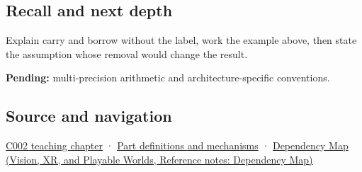 \subsection{Recall and next depth}\label{appendix-d52d5f78ffd1-recall-and-next-depth}

Explain carry and borrow without the label, work the example above, then state the assumption whose removal would change the result.

\textbf{Pending:} multi-precision arithmetic and architecture-specific conventions.

\subsection{Source and navigation}\label{appendix-d52d5f78ffd1-source-and-navigation}

\hyperref[01-foundations-i-ch001-arithmetic-becomes-a-policy]{C002 teaching chapter} · \hyperref[appendix-fd090d982a15]{Part definitions and mechanisms} · \href{../07-Vision-XR-and-Playable-Worlds/main.pdf\#nameddest=appendix-4ad47bdd269a}{Dependency Map (Vision, XR, and Playable Worlds, Reference notes: Dependency Map)}
